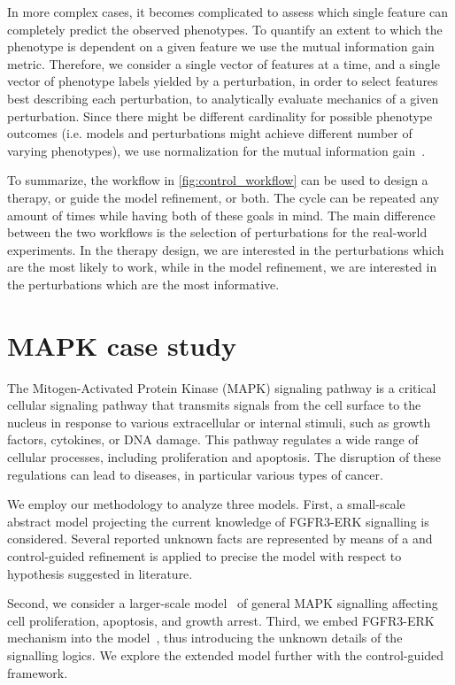 In more complex cases, it becomes complicated to assess which single feature can completely predict the observed phenotypes. To quantify an extent to which the phenotype is dependent on a given feature we use the mutual information gain metric. Therefore, we consider a single vector of features at a time, and a single vector of phenotype labels yielded by a perturbation, in order to select features best describing each perturbation, to analytically evaluate mechanics of a given perturbation. Since there might be different cardinality for possible phenotype outcomes (i.e. models and perturbations might achieve different number of varying phenotypes), we use normalization for the mutual information gain~\cite{Vinh2009}. 

To summarize, the workflow in \autoref{fig:control_workflow} can be used to design a therapy, or guide the model refinement, or both. The cycle can be repeated any amount of times while having both of these goals in mind. The main difference between the two workflows is the selection of perturbations for the real-world experiments. In the therapy design, we are interested in the perturbations which are the most likely to work, while in the model refinement, we are interested in the perturbations which are the most informative.

\section{MAPK case study}
\label{sec:mapk_case_study}
The Mitogen-Activated Protein Kinase (MAPK) signaling pathway is a critical cellular signaling pathway that transmits signals from the cell surface to the nucleus in response to various extracellular or internal stimuli, such as growth factors, cytokines, or DNA damage. This pathway regulates a wide range of cellular processes, including proliferation and apoptosis. The disruption of these regulations can lead to diseases, in particular various types of cancer.

We employ our methodology to analyze three models. First, a small-scale abstract model projecting the current knowledge of FGFR3-ERK signalling is considered. Several reported unknown facts are represented by means of a \PBN{} and control-guided refinement is applied to precise the model with respect to hypothesis suggested in literature. 

Second, we consider a larger-scale model~\cite{Grieco2013} of general MAPK signalling affecting cell proliferation, apoptosis, and growth arrest. Third, we embed FGFR3-ERK mechanism into the model~\cite{Grieco2013}, thus introducing the unknown details of the signalling logics. We explore the extended model further with the control-guided framework.

